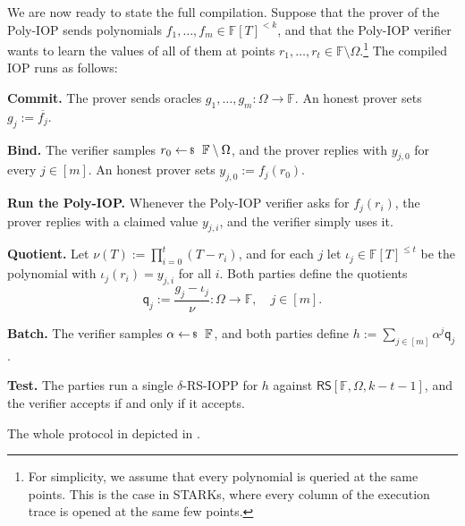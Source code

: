 \documentclass[../../book]{subfiles}
\begin{document}
We are now ready to state the full compilation.
Suppose that the prover of the Poly-IOP sends polynomials $f_1, \dots, f_m \in \mathbb{F}[T]^{<k}$, and that the Poly-IOP verifier wants to learn the values of all of them at points $r_1, \dots, r_t \in \mathbb{F} \setminus \Omega$.\footnote{For simplicity, we assume that every polynomial is queried at the same points. This is the case in STARKs, where every column of the execution trace is opened at the same few points.}
The compiled IOP runs as follows:
\begin{algoen}
    \item \textbf{Commit.} The prover sends oracles $g_1, \dots, g_m: \Omega \to \mathbb{F}$. An honest prover sets $g_j := \overline{f_j}$.
    \item \textbf{Bind.} The verifier samples $r_0 \leftarrowS \mathbb{F} \setminus \Omega$, and the prover replies with $y_{j,0}$ for every $j \in [m]$. An honest prover sets $y_{j,0} := f_j(r_0)$.
    \item \textbf{Run the Poly-IOP.} Whenever the Poly-IOP verifier asks for $f_j(r_i)$, the prover replies with a claimed value $y_{j,i}$, and the verifier simply uses it.
    \item \textbf{Quotient.} Let $\nu(T) := \prod_{i=0}^{t} (T - r_i)$, and for each $j$ let $\iota_j \in \mathbb{F}[T]^{\leq t}$ be the polynomial with $\iota_j(r_i) = y_{j,i}$ for all $i$. Both parties define the quotients
    \begin{equation*}
        \mathsf{q}_j := \frac{g_j - \iota_j}{\nu}: \Omega \to \mathbb{F}, \quad j \in [m].
    \end{equation*}
    \item \textbf{Batch.} The verifier samples $\alpha \leftarrowS \mathbb{F}$, and both parties define $h := \sum_{j \in [m]} \alpha^{j} \mathsf{q}_j$.
    \item \textbf{Test.} The parties run a single $\delta$-RS-IOPP for $h$ against $\mathsf{RS}[\mathbb{F}, \Omega, k - t - 1]$, and the verifier accepts if and only if it accepts.
\end{algoen}

The whole protocol in depicted in .
\end{document}
